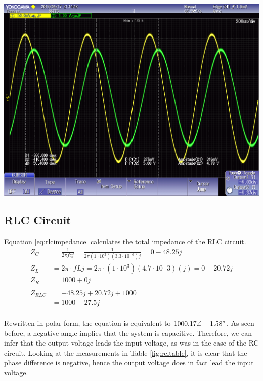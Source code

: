 \documentclass[journal]{IEEEtran}
\begin{document}
\begingroup
    \centering
    \medskip
    \includegraphics[width=\columnwidth]{images/lab8_017.png}
    \label{fig:rlosc2}
    \medskip
\endgroup


\subsection{RLC Circuit}
Equation \ref{eq:rlcimpedance} calculates the total impedance of the RLC circuit.\\


\begin{equation}
    \begin{split}
        Z_{C} & = \frac{1}{2\pi fcj} = \frac{1}{2\pi(1\cdot10^3)(3.3\cdot10^{-6})j} = 0 - 48.25j \\ 
        Z_{L} & = 2\pi\cdot fLj = 2\pi \cdot (1\cdot10^3)(4.7\cdot10^-3)(j) = 0 + 20.72j \\
        Z_{R} & = 1000 + 0j \\ 
        \\
        Z_{RLC} & = -48.25j + 20.72j + 1000\\
                & = 1000 - 27.5j
    \end{split}
    \label{eq:rlcimpedance}
\end{equation} \\

\noindent Rewritten in polar form, the equation is equivalent to $1000.17 \angle-1.58\degree$. As seen before, a negative angle implies that the system is capacitive. Therefore, we can infer that the output voltage leads the input voltage, as was in the case of the RC circuit. Looking at the measurements in Table \ref{fig:rcltable}, it is clear that the phase difference is negative, hence the output voltage does in fact lead the input voltage. 
\end{document}
